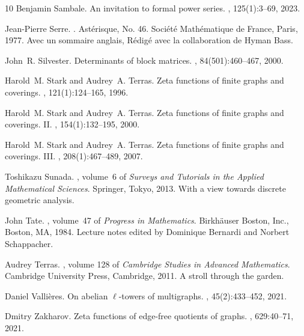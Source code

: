 \documentclass[11pt]{amsart}
\numberwithin{equation}{section}
\theoremstyle{remark}
\theoremstyle{definition}
\begin{document}
\begin{thebibliography}{10}
Benjamin Sambale.
\newblock An invitation to formal power series.
, 125(1):3--69, 2023.

Jean-Pierre Serre.
.
\newblock Ast\'{e}risque, No. 46. Soci\'{e}t\'{e} Math\'{e}matique de France, Paris, 1977.
\newblock Avec un sommaire anglais, R\'{e}dig\'{e} avec la collaboration de Hyman Bass.

John~R. Silvester.
\newblock Determinants of block matrices.
, 84(501):460--467, 2000.

Harold~M. Stark and Audrey~A. Terras.
\newblock Zeta functions of finite graphs and coverings.
, 121(1):124--165, 1996.

Harold~M. Stark and Audrey~A. Terras.
\newblock Zeta functions of finite graphs and coverings. {II}.
, 154(1):132--195, 2000.

Harold~M. Stark and Audrey~A. Terras.
\newblock Zeta functions of finite graphs and coverings. {III}.
, 208(1):467--489, 2007.

Toshikazu Sunada.
, volume~6 of {\em Surveys and Tutorials in the Applied Mathematical Sciences}.
\newblock Springer, Tokyo, 2013.
\newblock With a view towards discrete geometric analysis.

John Tate.
, volume~47 of {\em Progress in Mathematics}.
\newblock Birkh\"{a}user Boston, Inc., Boston, MA, 1984.
\newblock Lecture notes edited by Dominique Bernardi and Norbert Schappacher.

Audrey Terras.
, volume 128 of {\em Cambridge Studies in Advanced Mathematics}.
\newblock Cambridge University Press, Cambridge, 2011.
\newblock A stroll through the garden.

Daniel Valli\`eres.
\newblock On abelian {$\ell$}-towers of multigraphs.
, 45(2):433--452, 2021.

Dmitry Zakharov.
\newblock Zeta functions of edge-free quotients of graphs.
, 629:40--71, 2021.

\end{thebibliography}
\end{document}
